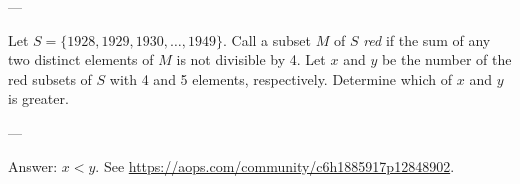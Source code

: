 
---

Let $S=\{1928,1929,1930,\ldots,1949\}$. Call a subset $M$ of $S$ \emph{red} if the sum of any two distinct elements of $M$ is not divisible by 4. Let $x$ and $y$ be the number of the red subsets of $S$ with 4 and 5 elements, respectively. Determine which of $x$ and $y$ is greater.

---

Answer: $x<y$. See \url{https://aops.com/community/c6h1885917p12848902}.
